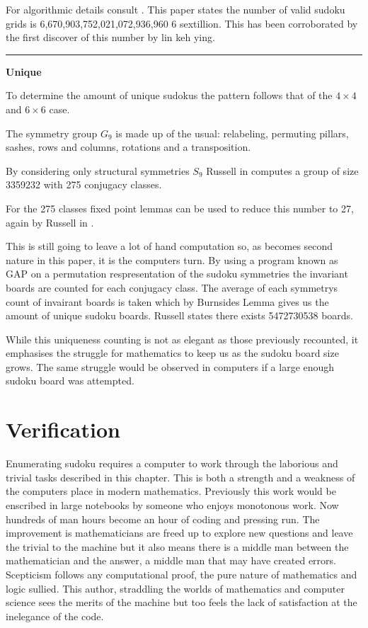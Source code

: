 \documentclass[a4paper,11pt]{report}
\newcounter{row}
\newcounter{col}
\begin{document}
For algorithmic details consult \cite{}. This paper states the number of valid sudoku grids is 6,670,903,752,021,072,936,960 6 sextillion. This has been corroborated by the first discover of this number by \cite{} lin keh ying.
 
 \noindent\rule{4cm}{0.4pt}
 
\textbf{Unique} 

To determine the amount of unique sudokus the pattern follows that of the $4\times 4$ and $6\times 6$ case. 

The symmetry group $G_9$ is made up of the usual: relabeling, permuting pillars, sashes, rows and columns, rotations and a transposition. 

By considering only structural symmetries $S_9$ Russell in \cite{} computes a group of size 3359232 with 275 conjugacy classes. 

For the 275 classes fixed point lemmas can be used to reduce this number to 27, again by Russell in \cite{}.

This is still going to leave a lot of hand computation so, as becomes second nature in this paper, it is the computers turn. By using a program known as GAP \cite{} on a permutation respresentation of the sudoku symmetries the invariant boards are counted for each conjugacy class. The average of each symmetrys count of invairant boards is taken which by Burnsides Lemma gives us the amount of unique sudoku boards. Russell states there exists 5472730538 boards. \cite{}

While this uniqueness counting is not as elegant as those previously recounted, it emphasises the struggle for mathematics to keep us as the sudoku board size grows. The same struggle would be observed in computers if a large enough sudoku board was attempted.

\section{Verification}

Enumerating sudoku requires a computer to work through the laborious and trivial tasks described in this chapter. This is both a strength and a weakness of the computers place in modern mathematics. Previously this work would be enscribed in large notebooks by someone who enjoys monotonous work. Now hundreds of man hours become an hour of coding and pressing run. The improvement is mathematicians are freed up to explore new questions and leave the trivial to the machine but it also means there is a middle man between the mathematician and the answer, a middle man that may have created errors. Scepticism follows any computational proof, the pure nature of mathematics and logic sullied. This author, straddling the worlds of mathematics and computer science sees the merits of the machine but too feels the lack of satisfaction at the inelegance of the code. 
\end{document}
